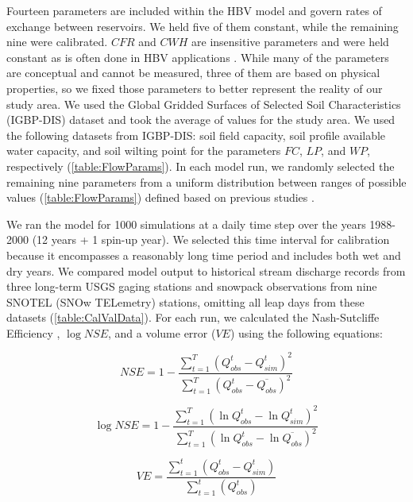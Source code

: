 \documentclass[water,article,submit,moreauthors,pdftex,10pt,a4paper]{mdpi}
\theoremstyle{mdpi}
\newcounter{ex}
\newcounter{re}
\theoremstyle{mdpidefinition}
\begin{document}
Fourteen parameters are included within the HBV model and govern rates of exchange between reservoirs. We held five of them constant, while the remaining nine were calibrated. $CFR$ and $CWH$ are insensitive parameters and were held constant as is often done in HBV applications \citep{Seibert:1997vw}. While many of the parameters are conceptual and cannot be measured, three of them are based on physical properties, so we fixed those parameters to better represent the reality of our study area. We used the Global Gridded Surfaces of Selected Soil Characteristics (IGBP-DIS) dataset \citep{Hope:1994wq} and took the average of values for the study area. We used the following datasets from IGBP-DIS: soil field capacity, soil profile available water capacity, and soil wilting point for the parameters $FC$, $LP$, and $WP$, respectively (\cref{table:FlowParams}). In each model run, we randomly selected the remaining nine parameters from a uniform distribution between ranges of possible values (\cref{table:FlowParams}) defined based on previous studies \citep{Inouye:2014ws,Han:2017tx}. 

We ran the model for 1000 simulations at a daily time step over the years 1988-2000 (12 years + 1 spin-up year). We selected this time interval for calibration because it encompasses a reasonably long time period and includes both wet and dry years. We compared model output to historical stream discharge records from three long-term USGS gaging stations and snowpack observations from nine SNOTEL (SNOw TELemetry) stations, omitting all leap days from these datasets (\cref{table:CalValData}). For each run, we calculated the Nash-Sutcliffe Efficiency \citep[$NSE$,][]{Nash:1970vw}, $\log NSE$, and a volume error ($VE$) using the following equations:

\begin{equation}
NSE = 1 - \frac{\sum_{t=1}^{T} \left(Q_{obs}^t - Q_{sim}^t\right)^2}{\sum_{t=1}^{T} \left(Q_{obs}^t - \overline{Q_{obs}}\right)^2}
\end{equation}

\begin{equation}
\log NSE = 1 - \frac{\sum_{t=1}^{T} \left(\ln{Q_{obs}^t} - \ln{Q_{sim}^t}\right)^2}{\sum_{t=1}^{T} \left(\ln{Q_{obs}^t} - \ln{\overline{Q_{obs}}}\right)^2}
\end{equation}

\begin{equation}
VE = \frac{\sum_{t=1}^{t} \left(Q_{obs}^t - Q_{sim}^t\right)}{\sum_{t=1}^{t} \left(Q_{obs}^t\right)}
\end{equation}
\end{document}
